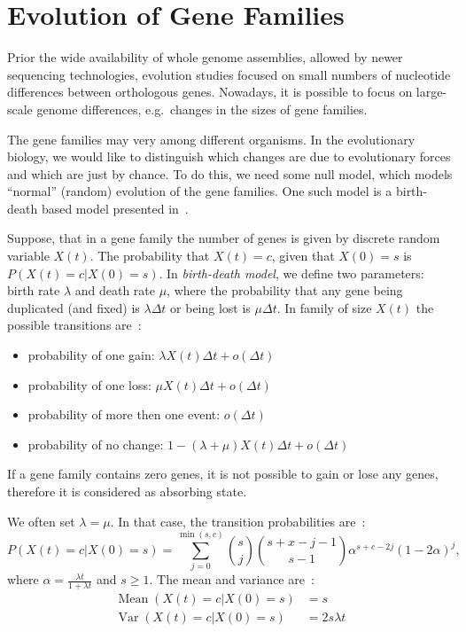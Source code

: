 \section{Evolution of Gene Families}

Prior the wide availability of whole genome assemblies, allowed by newer sequencing technologies, evolution studies focused on small numbers of nucleotide differences between orthologous genes. Nowadays, it is possible to focus on large-scale genome differences, e.g.\ changes in the sizes of gene families.

The gene families may very among different organisms. In the evolutionary biology, we would like to distinguish which changes are due to evolutionary forces and which are just by chance. To do this, we need some null model, which models ``normal'' (random) evolution of the gene families. One such model is a birth-death based model presented in~\cite{hahn2005estimating}.

Suppose, that in a gene family the number of genes is given by discrete random variable $X(t)$. The probability that $X(t) = c$, given that $X(0) = s$ is $P(X(t) = c | X(0) = s)$.
In \emph{birth-death model}, we define two parameters: birth rate $\lambda$ and death rate $\mu$, where the probability that any gene being duplicated (and fixed) is $\lambda \Delta t$ or being lost is $\mu \Delta t$. In family of size $X(t)$ the possible transitions are~\cite{hahn2005estimating}:
\begin{itemize}
  \item probability of one gain: $\lambda X(t) \Delta t + o(\Delta t)$
  \item probability of one loss: $\mu X(t) \Delta t + o(\Delta t)$
  \item probability of more then one event: $o(\Delta t)$
  \item probability of no change: $1 - (\lambda + \mu) X(t) \Delta t + o(\Delta t)$
\end{itemize}
If a gene family contains zero genes, it is not possible to gain or lose any genes, therefore it is considered as absorbing state.

We often set $\lambda = \mu$. In that case, the transition probabilities are~\cite{hahn2005estimating}:
$$P(X(t) = c | X(0) = s) = \sum_{j=0}^{\min(s, c)} {s \choose j}{s+x-j-1 \choose s-1}\alpha^{s+c-2j}{(1-2\alpha)}^j,$$
where $\alpha = \frac{\lambda t}{1+ \lambda t}$ and $s \geq 1$. The mean and variance are~\cite{hahn2005estimating}:
\begin{align*}
  \operatorname{Mean}(X(t) = c | X(0) = s) &= s\\
  \operatorname{Var}(X(t) = c | X(0) = s) &= 2s\lambda t
\end{align*}

